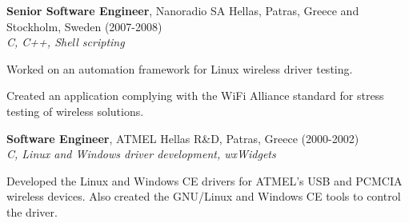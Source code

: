 \documentclass[alan.tex]{subfiles}
\begin{document}
  \item \textbf{Senior Software Engineer}, Nanoradio SA Hellas, Patras, Greece and Stockholm, Sweden (2007-2008)\\
  \emph { C, C++, Shell scripting }
    \begin{my_desc}
      \item[Worked] on an automation framework for Linux wireless driver testing.
      \item[Created] an application complying with the WiFi Alliance standard for stress testing of wireless solutions.
    \end{my_desc}
  \item \textbf{Software Engineer}, ATMEL Hellas R\&D, Patras, Greece (2000-2002)\\
    \emph{ C, Linux and Windows driver development, wxWidgets}
    \begin{my_desc}
      \item[Developed] the Linux and Windows CE drivers for ATMEL's USB and PCMCIA wireless devices. Also created the GNU/Linux and Windows CE tools to control the driver.
    \end{my_desc}
\end{document}
